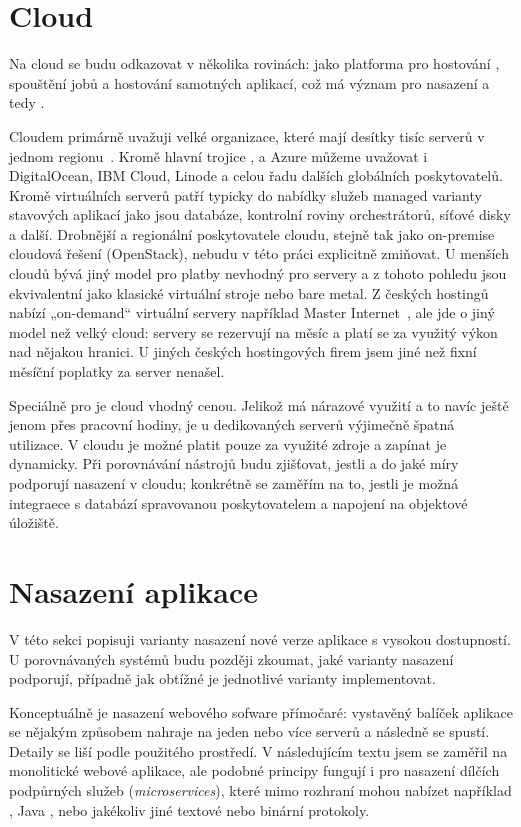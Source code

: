     \section*{Cloud}
        Na cloud se budu odkazovat v několika rovinách: jako platforma pro hostování \CI, spouštění jobů a hostování samotných aplikací, což má význam pro nasazení a tedy \CD.

        Cloudem primárně uvažuji velké organizace, které mají desítky tisíc serverů v jednom regionu~\cite{pier-cloud}. Kromě hlavní trojice ,  a Azure můžeme uvažovat i DigitalOcean, IBM Cloud, Linode a celou řadu dalších globálních poskytovatelů. Kromě virtuálních serverů patří typicky do nabídky služeb managed varianty stavových aplikací jako jsou databáze, kontrolní roviny orchestrátorů, síťové disky a další. Drobnější a regionální poskytovatele cloudu, stejně tak jako on-premise cloudová řešení (OpenStack), nebudu v této práci explicitně zmiňovat. U menších cloudů bývá jiný model pro platby nevhodný pro \CI servery a z tohoto pohledu jsou ekvivalentní jako klasické virtuální stroje nebo bare metal. Z českých hostingů nabízí „on-demand“ virtuální servery například Master Internet~\cite{master-pricing}, ale jde o jiný model než velký cloud: servery se rezervují na měsíc a platí se za využitý výkon nad nějakou hranici. U jiných českých hostingových firem jsem jiné než fixní měsíční poplatky za server nenašel.

        Speciálně pro \CI je cloud vhodný cenou. Jelikož \CI má nárazové využití a to navíc ještě jenom přes pracovní hodiny, je u dedikovaných serverů výjimečně špatná utilizace. V cloudu je možné platit pouze za využité zdroje a zapínat je dynamicky. Při porovnávání \CI nástrojů budu zjišťovat, jestli a do jaké míry podporují nasazení v cloudu; konkrétně se zaměřím na to, jestli je možná integraece s databází spravovanou poskytovatelem a napojení na objektové úložiště.

    \section*{Nasazení aplikace}
        V této sekci popisuji varianty nasazení nové verze aplikace s vysokou dostupností. U porovnávaných \CICD systémů budu později zkoumat, jaké varianty nasazení podporují, případně jak obtížné je jednotlivé varianty implementovat.

        Konceptuálně je nasazení webového sofware přímočaré: vystavěný balíček aplikace se nějakým způsobem nahraje na jeden nebo více serverů a následně se spustí. Detaily se liší podle použitého prostředí. V následujícím textu jsem se zaměřil na monolitické webové aplikace, ale podobné principy fungují i pro nasazení dílčích podpůrných služeb (\textit{microservices}), které mimo \HTTP rozhraní mohou nabízet například , Java , nebo jakékoliv jiné textové nebo binární protokoly.

